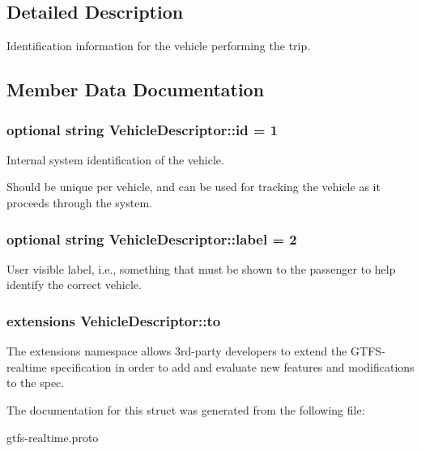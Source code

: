 \subsection{Detailed Description}
Identification information for the vehicle performing the trip. 

\subsection{Member Data Documentation}
\subsubsection[{\texorpdfstring{id}{id}}]{\setlength{\rightskip}{0pt plus 5cm}optional string Vehicle\+Descriptor\+::id = 1}\hypertarget{structVehicleDescriptor_af0b178595e9bbda85167bb49dfc4bb6b}{}\label{structVehicleDescriptor_af0b178595e9bbda85167bb49dfc4bb6b}


Internal system identification of the vehicle. 

Should be unique per vehicle, and can be used for tracking the vehicle as it proceeds through the system. 
\subsubsection[{\texorpdfstring{label}{label}}]{\setlength{\rightskip}{0pt plus 5cm}optional string Vehicle\+Descriptor\+::label = 2}\hypertarget{structVehicleDescriptor_a9007e0bbc4c086cd2a33aa15cd642829}{}\label{structVehicleDescriptor_a9007e0bbc4c086cd2a33aa15cd642829}


User visible label, i.\+e., something that must be shown to the passenger to help identify the correct vehicle. 

\subsubsection[{\texorpdfstring{to}{to}}]{\setlength{\rightskip}{0pt plus 5cm}extensions Vehicle\+Descriptor\+::to}\hypertarget{structVehicleDescriptor_a63dfb9a9be55a2ad46061bc66bed4b15}{}\label{structVehicleDescriptor_a63dfb9a9be55a2ad46061bc66bed4b15}


The extensions namespace allows 3rd-\/party developers to extend the G\+T\+F\+S-\/realtime specification in order to add and evaluate new features and modifications to the spec. 



The documentation for this struct was generated from the following file\+:\begin{DoxyCompactItemize}
\item 
gtfs-\/realtime.\+proto\end{DoxyCompactItemize}
